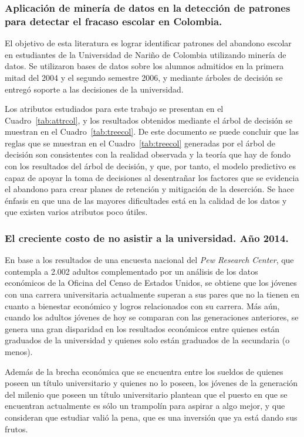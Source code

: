 \subsubsection{Aplicación de minería de datos en la detección de patrones para detectar el fracaso escolar en Colombia.}

El objetivo de esta literatura es lograr identificar patrones del abandono escolar en estudiantes de la Universidad de Nariño de Colombia utilizando minería de datos. Se utilizaron bases de datos sobre los alumnos admitidos en la primera mitad del 2004 y el segundo semestre 2006, y mediante árboles de decisión se entregó soporte a las decisiones de la universidad.

Los atributos estudiados para este trabajo se presentan en el Cuadro~\ref{tab:attrcol}, y los resultados obtenidos mediante el árbol de decisión se muestran en el Cuadro~\ref{tab:treecol}.
De este documento se puede concluir que las reglas que se muestran en el Cuadro~\ref{tab:treecol} generadas por el árbol de decisión son consistentes con la realidad observada y la teoría que hay de fondo con los resultados del árbol de decisión, y que, por tanto, el modelo predictivo es capaz de apoyar la toma de decisiones al desentrañar los factores que se evidencia el abandono para crear planes de retención y mitigación de la deserción. Se hace énfasis en que una de las mayores dificultades está en la calidad de los datos y que existen varios atributos poco útiles.

\subsubsection{El creciente costo de no asistir a la universidad. Año 2014.}
En base a los resultados de una encuesta nacional del \textit{Pew Research Center}, que contempla a 2.002 adultos complementado por un análisis de los datos económicos de la Oficina del Censo de Estados Unidos, se obtiene que los jóvenes con una carrera universitaria actualmente superan a sus pares que no la tienen en cuanto a bienestar económico y logros relacionados con su carrera. Más aún, cuando los adultos jóvenes de hoy se comparan con las generaciones anteriores, se genera una gran disparidad en los resultados económicos entre quienes están graduados de la universidad y quienes solo están graduados de la secundaria (o menos). 

Además de la brecha económica que se encuentra entre los sueldos de quienes poseen un título universitario y quienes no lo poseen, los jóvenes de la generación del milenio que poseen un título universitario plantean que el puesto en que se encuentran actualmente es sólo un trampolín para aspirar a algo mejor, y que consideran que estudiar valió la pena, que es una inversión que ya está dando sus frutos. 


